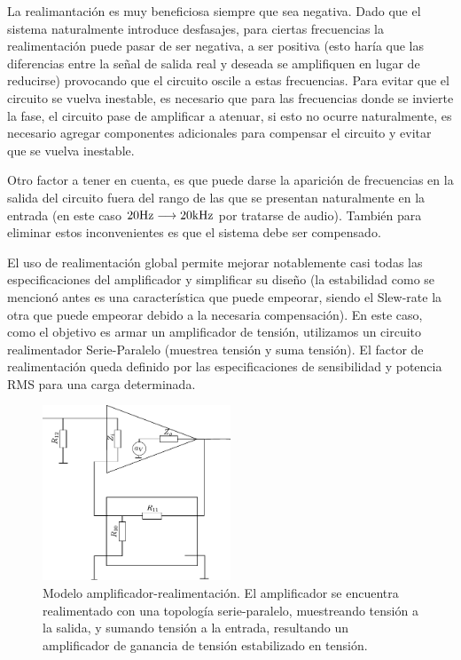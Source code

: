 La realimantación es muy beneficiosa siempre que sea negativa. Dado que el sistema naturalmente introduce desfasajes, para ciertas frecuencias la realimentación puede pasar de ser negativa, a ser positiva (esto haría que las diferencias entre la señal de salida real y deseada se amplifiquen en lugar de reducirse) provocando que el circuito oscile a estas frecuencias. Para evitar que el circuito se vuelva inestable, es necesario que para las frecuencias donde se invierte la fase, el circuito pase de amplificar a atenuar, si esto no ocurre naturalmente, es necesario agregar componentes adicionales para compensar el circuito y evitar que se vuelva inestable.

Otro factor a tener en cuenta, es que puede darse la aparición de frecuencias en la salida del circuito fuera del rango de las que se presentan naturalmente en la entrada (en este caso $20 \si[per-mode=symbol]{\hertz} \longrightarrow 20 \si[per-mode=symbol]{\kilo\hertz}$ por tratarse de audio). También para eliminar estos inconvenientes es que el sistema debe ser compensado.

El uso de realimentación global permite mejorar notablemente casi todas las especificaciones del amplificador y simplificar su diseño (la estabilidad como se mencionó antes es una característica que puede empeorar, siendo el Slew-rate la otra que puede empeorar debido a la necesaria compensación). En este caso, como el objetivo es armar un amplificador de tensión, utilizamos un circuito realimentador Serie-Paralelo (muestrea tensión y suma tensión). El factor de realimentación queda definido por las especificaciones de sensibilidad y potencia RMS para una carga determinada.


\begin{figure}[H]
	\centering
	\includegraphics[width=0.5\textwidth]{img/realimentacion}
	\caption{Modelo amplificador-realimentación. El amplificador se encuentra realimentado con una topología serie-paralelo, muestreando tensión a la salida, y sumando tensión a la entrada, resultando un amplificador de ganancia de tensión estabilizado en tensión.}
	\label{fig:ampli_feedback_blocks}
\end{figure}


